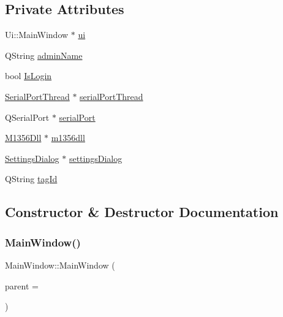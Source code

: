 \subsection*{Private Attributes}
\begin{DoxyCompactItemize}
\item 
Ui\+::\+Main\+Window $\ast$ \mbox{\hyperlink{class_main_window_a35466a70ed47252a0191168126a352a5}{ui}}
\item 
Q\+String \mbox{\hyperlink{class_main_window_a92be8d1f153266b0392fcd547bc6510d}{admin\+Name}}
\item 
bool \mbox{\hyperlink{class_main_window_a85a8d6caafb8c80a5b6433cfff8ae3a8}{Is\+Login}}
\item 
\mbox{\hyperlink{class_serial_port_thread}{Serial\+Port\+Thread}} $\ast$ \mbox{\hyperlink{class_main_window_aa9781bbd758a56ac8b1a58d4295aef54}{serial\+Port\+Thread}}
\item 
Q\+Serial\+Port $\ast$ \mbox{\hyperlink{class_main_window_af0e11334b4b4d0e16e35111b6381eb37}{serial\+Port}}
\item 
\mbox{\hyperlink{class_m1356_dll}{M1356\+Dll}} $\ast$ \mbox{\hyperlink{class_main_window_a482918b811fc8fa1a18705848782b595}{m1356dll}}
\item 
\mbox{\hyperlink{class_settings_dialog}{Settings\+Dialog}} $\ast$ \mbox{\hyperlink{class_main_window_aef5f3e9b117558b9c1d633231bd0d833}{settings\+Dialog}}
\item 
Q\+String \mbox{\hyperlink{class_main_window_aab96767ee78290ec955f98371500969f}{tag\+Id}}
\end{DoxyCompactItemize}


\subsection{Constructor \& Destructor Documentation}
\mbox{\label{class_main_window_a8b244be8b7b7db1b08de2a2acb9409db}} 
\subsubsection{\texorpdfstring{MainWindow()}{MainWindow()}}
{\footnotesize\ttfamily Main\+Window\+::\+Main\+Window (\begin{DoxyParamCaption}\item[{Q\+Widget $\ast$}]{parent = {} }\end{DoxyParamCaption})\hspace{0.3cm}{\ttfamily [explicit]}}

